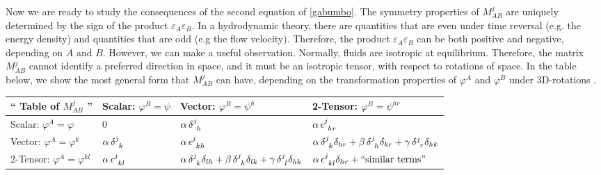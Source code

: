 \documentclass[a4paper, amsfonts, amssymb, amsmath, reprint, showkeys, nofootinbib, twoside, onecolumn,notitlepage]{revtex4-1}
\begin{document}
Now we are ready to study the consequences of the second equation of \eqref{gabumbo}. The symmetry properties of $M^j_{AB}$ are uniquely determined by the sign of the product $\varepsilon_A\varepsilon_B$. In a hydrodynamic theory, there are quantities that are even under time reversal (e.g. the energy density) and quantities that are odd (e.g the flow velocity). Therefore, the product $\varepsilon_A \varepsilon_B$ can be both positive and negative, depending on $A$ and $B$. However, we can make a useful observation. Normally, fluids are isotropic at equilibrium. Therefore, the matrix $M^j_{AB}$ cannot identify a preferred direction in space, and it must be an isotropic tensor, with respect to rotations of space. In the table below, we show the most general form that $M^j_{AB}$ can have, depending on the transformation properties of $\varphi^A$ and $\varphi^B$ under 3D-rotations \cite{Kearsley1975}.
\renewcommand{\arraystretch}{1.5}
\begin{center}
\begin{tabular}{ |l||l|l|l| } 
 \hline
`` Table of $M^j_{AB}$ ''  & Scalar: $\varphi^B=\psi$ & Vector: $\varphi^B=\psi^h$ & 2-Tensor: $\varphi^B=\psi^{hr}$ \\ \hline \hline
Scalar: $\varphi^A=\varphi$ & 0 & $\alpha \, \delta\indices{^j _h}$ & $\alpha \, \epsilon\indices{^j _h _r}$  \\ \hline
Vector: $\varphi^A=\varphi^k$ & $\alpha \, \delta\indices{^j _k}$ & $\alpha \, \epsilon\indices{^j _k _h}$ &  $\alpha \, \delta\indices{^j _k}\delta_{hr} + \beta \, \delta\indices{^j _h}\delta_{kr}+\gamma \, \delta\indices{^j _r}\delta_{hk}$  \\ \hline
2-Tensor: $\varphi^A=\varphi^{kl}$ &  $\alpha \, \epsilon\indices{^j _k _l}$ & $\alpha \, \delta\indices{^j _k}\delta_{lh} + \beta \, \delta\indices{^j _h}\delta_{lk}+\gamma \, \delta\indices{^j _l}\delta_{hk}$ & $\alpha \, \epsilon\indices{^j _k _l} \delta_{hr} + \text{``similar terms''}$  \\ 
 \hline
\end{tabular}
\end{center}
\end{document}
